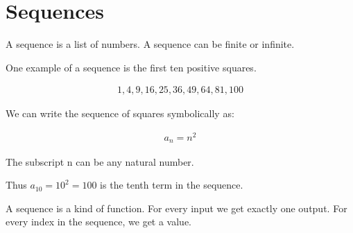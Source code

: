 \documentclass{article}
\begin{document}
\section{Sequences}
\begin{flushleft}
A sequence is a list of numbers. A sequence can be finite or infinite.
\end{flushleft}
\begin{flushleft}
One example of a sequence is the first ten positive squares.
\end{flushleft}
\begin{align*}
1, 4, 9, 16, 25, 36, 49, 64, 81, 100
\end{align*}
\begin{flushleft}
We can write the sequence of squares symbolically as:
\end{flushleft}
\begin{align*}
a_{n} = n^2 
\end{align*}
\begin{flushleft}
The subscript n can be any natural number. 
\end{flushleft}
\begin{flushleft}
Thus $a_{10} = 10^2 = 100$ is the tenth term in the sequence.
\end{flushleft}
\begin{flushleft}
A sequence is a kind of function. For every input we get exactly one output. For every index in the sequence, we get a value.
\end{flushleft}
\end{document}

